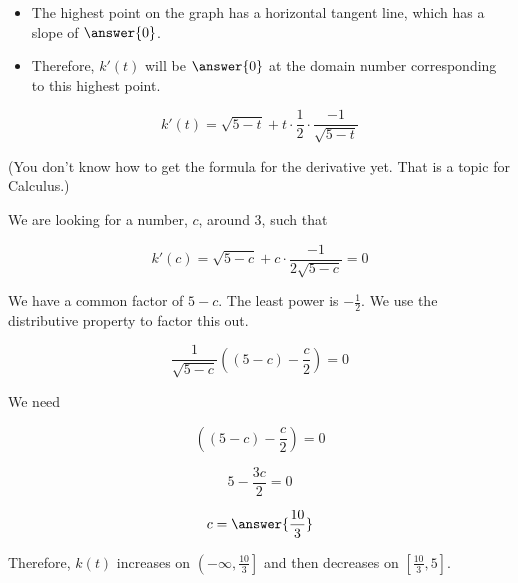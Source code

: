 \documentclass{ximera}
\begin{document}
\begin{explanation}


\begin{itemize}
\item The highest point on the graph has a horizontal tangent line, which has a slope of $\answer{0}$.  
\item Therefore, $k'(t)$ will be $\answer{0}$ at the domain number corresponding to this highest point.
\end{itemize}




\[   k'(t) = \sqrt{5-t} + t \cdot \frac{1}{2} \cdot \frac{-1}{\sqrt{5-t}}    \]

(You don't know how to get the formula for the derivative yet.  That is a topic for Calculus.)

We are looking for a number, $c$, around $3$, such that 


\[   k'(c) = \sqrt{5-c} + c \cdot \frac{-1}{2 \sqrt{5-c}}  = 0  \]

We have a common factor of $5-c$.  The least power is $-\frac{1}{2}$.  We use the distributive property to factor this out.


\[  \frac{1}{\sqrt{5-c}} \left( (5-c) - \frac{c}{2} \right) = 0  \]




We need 


\[  \left( (5-c) - \frac{c}{2} \right) = 0  \]

\[  5 - \frac{3c}{2}  = 0  \]


\[  c = \answer{\frac{10}{3}}  \]


\end{explanation}


Therefore, $k(t)$ increases on $\left(-\infty, \frac{10}{3}\right]$ and then decreases on $\left[\frac{10}{3},5\right]$.
\end{document}
